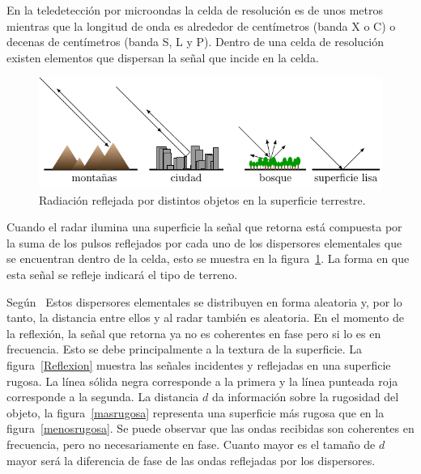 
En la teledetección por microondas la celda de resolución es de unos metros mientras que la longitud de onda es alrededor de centímetros (banda X o C) o decenas de centímetros (banda S, L y P). Dentro de una celda de resolución existen elementos que dispersan la señal que incide en la celda.

\begin{figure}[hbt]
	\centering    
	\includegraphics[scale=1]{../../Figures/Tesis/Capitulo3/Backscatter2.pdf}
	\caption{\label{Backscatter}Radiación reflejada por distintos objetos en la superficie terrestre.}
\end{figure} 

Cuando el radar ilumina una superficie la señal que retorna está compuesta por la suma de los pulsos reflejados por cada uno de los dispersores elementales que se encuentran dentro de la celda, esto se muestra en la figura~\ref{Backscatter}. La forma en que esta señal se refleje indicará el tipo de terreno.

Según~\citet{Lee2009} Estos dispersores elementales se distribuyen en forma aleatoria y, por lo tanto, la distancia entre ellos y al radar también es aleatoria. 
En el momento de la reflexión, la señal que retorna ya no es coherentes en fase pero si lo es en frecuencia. Esto se debe principalmente a la textura de la superficie. La figura~\ref{Reflexion} muestra las señales incidentes y reflejadas en una superficie rugosa. La línea sólida negra corresponde a la primera y la línea punteada roja corresponde a la segunda. La distancia $d$ da información sobre la rugosidad del objeto, la figura~\ref{masrugosa} representa una superficie más rugosa que en la figura~\ref{menosrugosa}. Se puede observar que las ondas recibidas son coherentes en frecuencia, pero no necesariamente en fase. Cuanto mayor es el tamaño de $d$ mayor será la diferencia de fase de las ondas reflejadas por los dispersores.

